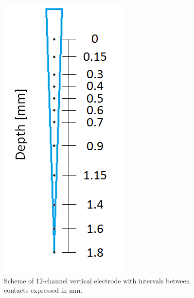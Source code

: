 \documentclass{pracalicmgr}
\begin{document}
   \begin{figure}[H]
   	\begin{center}
   		\includegraphics[scale=0.5]{electrode.png}
   	\end{center}
   	\caption{Scheme of 12-channel vertical electrode with intervals between contacts expressed in mm.}
   	\label{rys:electrode}
   \end{figure}
  
\end{document}

